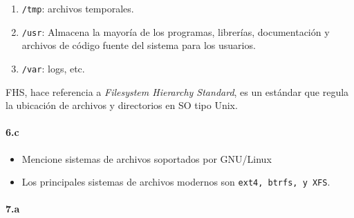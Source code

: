 \documentclass[10pt,a4paper]{paper}
\begin{document}
\begin{itemize}
\begin{enumerate}
			\item \texttt{/tmp}: archivos temporales.
			
			\item \texttt{/usr}: Almacena la mayoría de los programas, librerías,
			documentación y archivos de código fuente del sistema para los usuarios.
			
			\item \texttt{/var}: logs, etc.
		\end{enumerate}
		
		FHS, hace referencia a \textit{Filesystem Hierarchy Standard}, es un estándar
		que regula la ubicación de archivos y directorios en SO tipo Unix.  
	\end{itemize}
	
	
	\paragraph{6.c}
	\begin{itemize}
		\item Mencione sistemas de archivos soportados por GNU/Linux
		
		\item Los principales sistemas de archivos modernos son \texttt{ext4, btrfs, y
			XFS}.
	\end{itemize}
	
	
	
	\paragraph{7.a}
	
\end{document}
